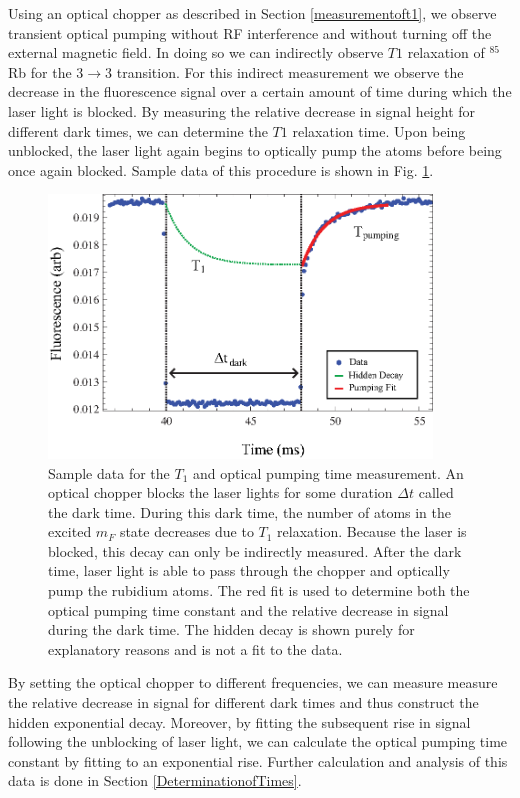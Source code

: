 Using an optical chopper as described in Section \ref{measurementoft1}, we observe transient optical pumping without RF interference and without turning off the external magnetic field.  In doing so we can indirectly observe $T1$ relaxation of $^{85}$Rb for the $3 \rightarrow 3$ transition.  For this indirect measurement we observe the decrease in the fluorescence signal over a certain amount of time during which the laser light is blocked.  By measuring the relative decrease in signal height for different dark times, we can determine the $T1$ relaxation time. Upon being unblocked, the laser light again begins to optically pump the atoms before being once again blocked.  Sample data of this procedure is shown in Fig. \ref{fig:chop}.
\begin{figure}[htbp]
\begin{center}
\includegraphics[height=70mm]{./figures/raw_chop.eps}
\caption{\small{Sample data for the $T_1$ and optical pumping time measurement.  An optical chopper blocks the laser lights for some duration $\Delta t$ called the dark time.  During this dark time, the number of atoms in the excited $m_F$ state decreases due to $T_1$ relaxation.  Because the laser is blocked, this decay can only be indirectly measured.  After the dark time, laser light is able to pass through the chopper and optically pump the rubidium atoms.  The red fit is used to determine both the optical pumping time constant and the relative decrease in signal during the dark time. The hidden decay is shown purely for explanatory reasons and is not a fit to the data.}}
\label{fig:chop}
\end{center}
\end{figure}
By setting the optical chopper to different frequencies, we can measure measure the relative decrease in signal for different dark times and thus construct the hidden exponential decay.  Moreover, by fitting the subsequent rise in signal following the unblocking of laser light, we can calculate the optical pumping time constant by fitting to an exponential rise.  Further calculation and analysis of this data is done in Section \ref{DeterminationofTimes}.

